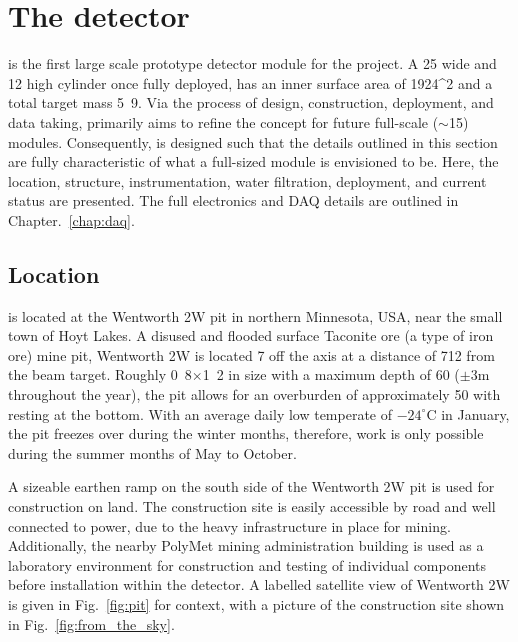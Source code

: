 \section{The \chipsfive detector} %
\label{sec:chips_detector} %

\chipsfive is the first large scale prototype detector module for the \chips project. A
\unit{25}{} wide and \unit{12}{} high cylinder once fully deployed, \chipsfive
has an inner surface area of \unit{1924}{^2} and a total target mass
\unit{5.9}{}. Via the process of design, construction, deployment, and data taking,
\chipsfive primarily aims to refine the \chips concept for future full-scale
($\sim$\unit{15}{}) modules. Consequently, \chipsfive is designed such that the
details outlined in this section are fully characteristic of what a full-sized \chips module is
envisioned to be. Here, the location, structure, instrumentation, water filtration, deployment,
and current status are presented. The full electronics and DAQ details are outlined in
Chapter.~\ref{chap:daq}.

\subsection{Location} %
\label{sec:chips_detector_location} %

\chipsfive is located at the Wentworth 2W pit in northern Minnesota, USA, near the small town of
Hoyt Lakes. A disused and flooded surface Taconite ore (a type of iron ore) mine pit, Wentworth 2W
is located \unit{7}{} off the \numi axis at a distance of \unit{712}{}
from the beam target. Roughly \unit{0.8}{}$\times$\unit{1.2}{} in size with
a maximum depth of \unit{60}{} ($\pm3\mathrm{m}$ throughout the year), the pit allows
for an overburden of approximately \unit{50}{} with \chipsfive resting at the bottom.
With an average daily low temperate of $-24^{\circ}\mathrm{C}$ in January, the pit freezes over
during the winter months, therefore, work is only possible during the summer months of May to
October.

A sizeable earthen ramp on the south side of the Wentworth 2W pit is used for construction on
land. The construction site is easily accessible by road and well connected to power, due to the
heavy infrastructure in place for mining. Additionally, the nearby PolyMet mining administration
building is used as a laboratory environment for construction and testing of individual components
before installation within the detector. A labelled satellite view of Wentworth 2W is given in
Fig.~\ref{fig:pit} for context, with a picture of the construction site shown in
Fig.~\ref{fig:from_the_sky}.

